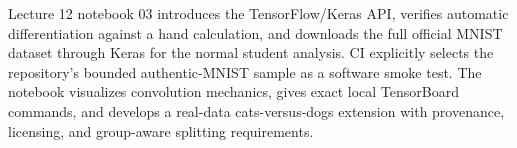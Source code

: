 \begin{notebooklink}
Lecture 12 notebook 03 introduces the TensorFlow/Keras API, verifies automatic
differentiation against a hand calculation, and downloads the full official
MNIST dataset through Keras for the normal student analysis. CI explicitly
selects the repository's bounded authentic-MNIST sample as a software smoke
test. The notebook visualizes convolution mechanics, gives exact local
TensorBoard commands, and develops a real-data cats-versus-dogs extension with
provenance, licensing, and group-aware splitting requirements.
\end{notebooklink}
